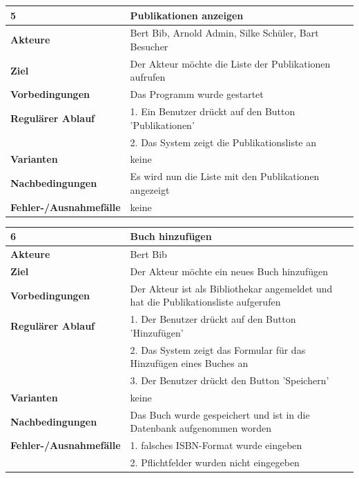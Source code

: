 \documentclass[fontsize=12pt,paper=a4,twoside]{scrartcl}
\begin{document}
\begin{table}[htbp]
\label{5}
\begin{tabular}{|l|p{10cm}|}
\hline 
\textbf{5} & \textbf{Publikationen anzeigen} \\ \hline
\textbf{Akteure} & Bert Bib, Arnold Admin, Silke Schüler, Bart Besucher\\ \hline
\textbf{Ziel} & Der Akteur möchte die Liste der Publikationen aufrufen  \\ \hline
\textbf{Vorbedingungen} & Das Programm wurde gestartet  \\ \hline
\textbf{Regulärer Ablauf} & 
1. Ein Benutzer drückt auf den Button 'Publikationen' \\
&2. Das System zeigt die Publikationsliste an\\
\hline
\textbf{Varianten} & 
keine \\ \hline
\textbf{Nachbedingungen} & Es wird nun die Liste mit den Publikationen angezeigt \\ \hline
\textbf{Fehler-/Ausnahmefälle} & keine\\
\hline
\end{tabular}
\end{table}

\begin{table}[htbp]
\label{6}
\begin{tabular}{|l|p{10cm}|}
\hline 
\textbf{6} & \textbf{Buch hinzufügen} \\ \hline
\textbf{Akteure} & Bert Bib\\ \hline
\textbf{Ziel} & Der Akteur möchte ein neues Buch hinzufügen \\ \hline
\textbf{Vorbedingungen} & Der Akteur ist als Bibliothekar angemeldet und hat die Publikationsliste aufgerufen  \\ \hline
\textbf{Regulärer Ablauf} & 
1. Der Benutzer drückt auf den Button 'Hinzufügen' \\
&2. Das System zeigt das Formular für das Hinzufügen eines Buches an\\
&3. Der Benutzer drückt den Button 'Speichern'\\
\hline
\textbf{Varianten} & 
keine \\ \hline
\textbf{Nachbedingungen} & Das Buch wurde gespeichert und ist in die Datenbank aufgenommen worden\\ \hline
\textbf{Fehler-/Ausnahmefälle} & 1. falsches ISBN-Format wurde eingeben\\
&2. Pflichtfelder wurden nicht eingegeben\\
\hline
\end{tabular}
\end{table}
\end{document}
